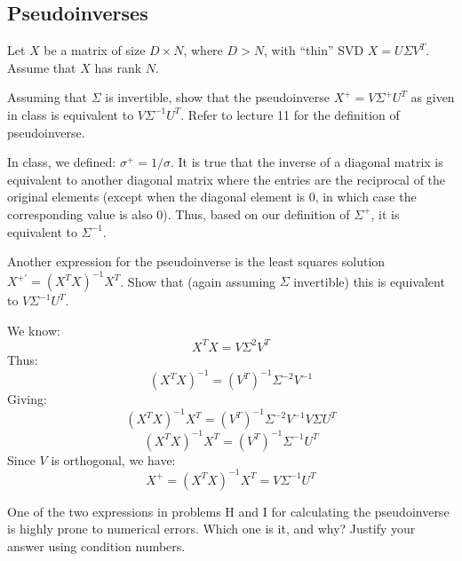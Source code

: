 \subsection{Pseudoinverses} Let $X$ be a matrix of size $D \times N$, where $D > N$, with ``thin'' SVD $X = U\Sigma V^T$. Assume that $X$ has rank $N$.

\problem[4] Assuming that $\Sigma$ is invertible, show that the pseudoinverse $X^+ = V\Sigma^+ U^T$ as given in class is equivalent to $V\Sigma^{-1} U^T$. Refer to lecture 11 for the definition of pseudoinverse.

\begin{solution}
 In class, we defined: $\sigma^+ = 1/\sigma$. It is true that the inverse of a diagonal matrix is equivalent to another diagonal matrix where the entries are the reciprocal of the original elements (except when the diagonal element is 0, in which case the corresponding value is also 0). Thus, based on our definition of $\Sigma^+$, it is equivalent to $\Sigma^{-1}$. 

\end{solution}

\problem[4] Another expression for the pseudoinverse is the least squares solution $X^{+'} = (X^T X)^{-1}X^T$. Show that (again assuming $\Sigma$ invertible) this is equivalent to $V\Sigma^{-1}U^T$.

\begin{solution}
 We know:
 \begin{equation}
	 X^TX = V\Sigma^2V^T
 \end{equation}
 Thus:
 \begin{equation}
	 (X^TX)^{-1} = (V^T)^{-1}\Sigma^{-2}V^{-1}
 \end{equation}
 Giving:
 \begin{equation}
	(X^TX)^{-1}X^T = (V^T)^{-1}\Sigma^{-2}V^{-1}V\Sigma U^T
 \end{equation}
 \begin{equation}
	(X^TX)^{-1}X^T = (V^T)^{-1}\Sigma^{-1} U^T
 \end{equation}
 Since $V$ is orthogonal, we have:
 \begin{equation}
	X^+=(X^TX)^{-1}X^T = V\Sigma^{-1} U^T
 \end{equation}
\end{solution}

\problem[2] One of the two expressions in problems H and I for calculating the pseudoinverse is highly prone to numerical errors. Which one is it, and why? Justify your answer using condition numbers.

